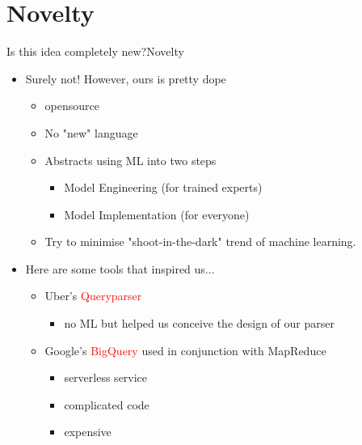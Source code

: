 \documentclass[handout, xcolor={dvipsnames}]{beamer}
\begin{document}
\section{Novelty}
\begin{frame}{Is this idea completely new?}{Novelty}
  \begin{itemize}
  \item<1-> {
   Surely not! However, ours is pretty dope
   \begin{itemize}
       \color{ForestGreen}
       \item opensource
       \item No "new" language
       \item Abstracts using ML into two steps
        \begin{itemize}
        \color{blue}
            \item Model Engineering (for trained experts)
            \item Model Implementation (for everyone)
        \end{itemize}
       \item Try to minimise "shoot-in-the-dark" trend of machine learning.
   \end{itemize} 
  }
  \vspace{.2in}
  \item<2->{
  Here are some tools that inspired us...
  }
      \begin{itemize}
          \item<3-> Uber's \textcolor{red}{Queryparser} \cite{QueryParser} 
          \begin{itemize}
              \item<3-> no ML but helped us conceive the design of our parser
          \end{itemize}
          
          \vspace{.2in}
          
          \item<4-> Google's \textcolor{red}{BigQuery} \cite{BigQuery} used in conjunction with MapReduce
          \begin{itemize}
          \item<4-> serverless service
          \item<4-> complicated code
          \item<4-> expensive
          \end{itemize}
          
      \end{itemize}
  \end{itemize}
\end{frame}
\end{document}
